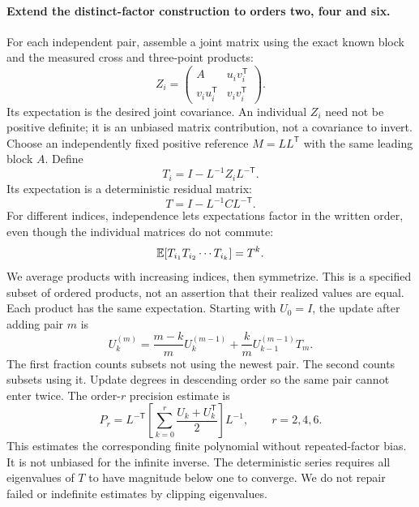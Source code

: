 \paragraph{Extend the distinct-factor construction to orders two, four and six.}
For each independent pair, assemble a joint matrix using the exact known
block and the measured cross and three-point products:
\begin{equation}
 Z_i=\begin{pmatrix}A&u_iv_i^{\mathsf T}\\v_iu_i^{\mathsf T}&v_iv_i^{\mathsf T}\end{pmatrix}.
\end{equation}
Its expectation is the desired joint covariance. An individual $Z_i$ need
not be positive definite; it is an unbiased matrix contribution, not a
covariance to invert. Choose an independently fixed positive reference
$M=LL^{\mathsf T}$ with the same leading block $A$. Define
\begin{equation}
 T_i=I-L^{-1}Z_iL^{-\mathsf T}.
\end{equation}
Its expectation is a deterministic residual matrix:
\begin{equation}
 T=I-L^{-1}CL^{-\mathsf T}.
\end{equation}
For different indices, independence lets expectations factor in the written
order, even though the individual matrices do not commute:
\begin{equation}
 \mathbb{E}[T_{i_1}T_{i_2}\cdots T_{i_k}]=T^k.
\end{equation}
We average products with increasing indices, then symmetrize. This is a
specified subset of ordered products, not an assertion that their realized
values are equal. Each product has the same expectation. Starting with
$U_0=I$, the update after adding pair $m$ is
\begin{equation}
 U_k^{(m)}=\frac{m-k}{m}U_k^{(m-1)}
 +\frac{k}{m}U_{k-1}^{(m-1)}T_m.
\end{equation}
The first fraction counts subsets not using the newest pair. The second
counts subsets using it. Update degrees in descending order so the same
pair cannot enter twice. The order-$r$ precision estimate is
\begin{equation}
 P_r=L^{-\mathsf T}\left[\sum_{k=0}^{r}
 \frac{U_k+U_k^{\mathsf T}}{2}\right]L^{-1},\qquad r=2,4,6.
\end{equation}
This estimates the corresponding finite polynomial without repeated-factor
bias. It is not unbiased for the infinite inverse. The deterministic series
requires all eigenvalues of $T$ to have magnitude below one to converge.
We do not repair failed or indefinite estimates by clipping eigenvalues.


